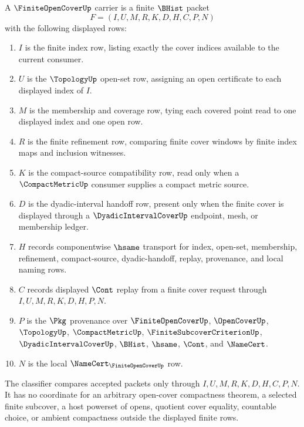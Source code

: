 \begin{definition}
\label{def:finite-open-cover-carrier}
A $\FiniteOpenCoverUp$ carrier is a finite $\BHist$ packet
$$
F=(I,U,M,R,K,D,H,C,P,N)
$$
with the following displayed rows:
\begin{enumerate}
\item $I$ is the finite index row, listing exactly the cover indices available to the current consumer.
\item $U$ is the $\TopologyUp$ open-set row, assigning an open certificate to each displayed index of $I$.
\item $M$ is the membership and coverage row, tying each covered point read to one displayed index and one open row.
\item $R$ is the finite refinement row, comparing finite cover windows by finite index maps and inclusion witnesses.
\item $K$ is the compact-source compatibility row, read only when a $\CompactMetricUp$ consumer supplies a compact metric source.
\item $D$ is the dyadic-interval handoff row, present only when the finite cover is displayed through a $\DyadicIntervalCoverUp$ endpoint, mesh, or membership ledger.
\item $H$ records componentwise $\hsame$ transport for index, open-set, membership, refinement, compact-source, dyadic-handoff, replay, provenance, and local naming rows.
\item $C$ records displayed $\Cont$ replay from a finite cover request through $I,U,M,R,K,D,H,P,N$.
\item $P$ is the $\Pkg$ provenance over $\FiniteOpenCoverUp$, $\OpenCoverUp$, $\TopologyUp$, $\CompactMetricUp$, $\FiniteSubcoverCriterionUp$, $\DyadicIntervalCoverUp$, $\BHist$, $\hsame$, $\Cont$, and $\NameCert$.
\item $N$ is the local $\NameCert_{\FiniteOpenCoverUp}$ row.
\end{enumerate}
The classifier compares accepted packets only through $I,U,M,R,K,D,H,C,P,N$. It has no coordinate for an arbitrary open-cover compactness theorem, a selected finite subcover, a host powerset of opens, quotient cover equality, countable choice, or ambient compactness outside the displayed finite rows.
\end{definition}

